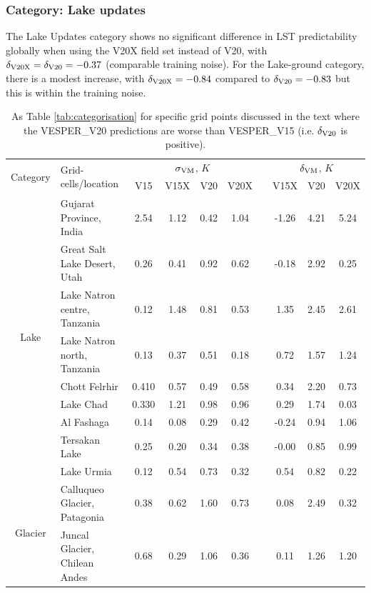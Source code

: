 \documentclass[hess, twostagejnl]{copernicus}
\begin{document}
\subsubsection{Category: Lake updates}\label{sec:lake2}
The Lake Updates category shows no significant difference in LST predictability globally when using the V20X field set instead of V20, with $\delta_{\rm V20X} = \delta_{\rm V20} = -0.37$ (comparable training noise). For the Lake-ground category, there is a modest increase, with $\delta_{\rm V20X} = -0.84$ compared to   $\delta_{\rm V20} = -0.83$ but this is within the training noise.
\begin{table}
	\begin{tabular}{clcccccccc}
		\toprule
		\multirow{2}{*}{Category} & \multirow{2}{*}{Grid-cells/location} & 	\multicolumn{4}{c}{$\sigma_{\rm VM}$, $K$} &&\multicolumn{3}{c}{$\delta_{\rm VM}$, $K$} \\  
		&&V15  & V15X & V20 & V20X && V15X &V20 & V20X  \\
		\hline 
		\multirow{9}{*}{Lake}&Gujarat Province, India& 2.54 &1.12 &0.42 &1.04 && -1.26 &4.21& 5.24 \\
		&Great Salt Lake Desert, Utah&0.26 &0.41 &0.92 &0.62 && -0.18 &2.92 &0.25\\
		&Lake Natron centre, Tanzania&0.12 &1.48 &0.81& 0.53 && 1.35& 2.45& 2.61 \\
		&Lake Natron north, Tanzania&0.13 &0.37 &0.51& 0.18 && 0.72 &1.57 &1.24 \\
		&Chott Felrhir&0.410 &0.57& 0.49& 0.58 && 0.34 &2.20& 0.73 \\
		&Lake Chad&0.330 &1.21 &0.98 &0.96 && 0.29 &1.74 &0.03\\
		&Al Fashaga&0.14 &0.08 &0.29 &0.42 && -0.24& 0.94 &1.06 \\
		&Tersakan Lake&0.25 &0.20& 0.34 &0.38 && -0.00 &0.85 &0.99 \\
		&Lake Urmia&0.12& 0.54 &0.73 &0.32 && 0.54 &0.82 &0.22 \\
		\hline 
		\multirow{2}{*}{Glacier}&Calluqueo Glacier, Patagonia&0.38 &0.62& 1.60 &0.73 && 0.08& 2.49 &0.32\\
		&Juncal Glacier, Chilean Andes &0.68& 0.29& 1.06& 0.36 && 0.11 &1.26 &1.20 \\
		\bottomrule
	\end{tabular}
	\caption{As Table \ref{tab:categorisation} for specific grid points discussed in the text where the VESPER\_V20 predictions are worse than VESPER\_V15 (i.e. $\delta_{\rm V20}$ is positive).}
	\label{tab:categorisation2}
\end{table}
\end{document}
